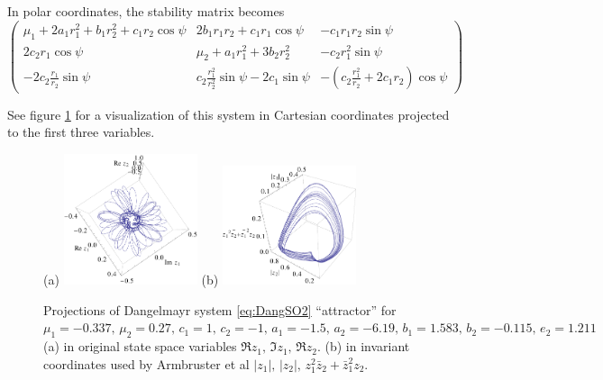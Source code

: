 \documentclass{article}
\begin{document}
In polar coordinates, the stability matrix becomes
\begin{equation}
\left(\begin{array}{ccc}
\mu_1+2a_1r_1^2+b_1r_2^2+c_1r_2\cos\psi & 2b_1r_1r_2+c_1r_1\cos\psi & -c_1r_1r_2\sin\psi\\
2c_2r_1\cos\psi & \mu_2+a_1r_1^2+3b_2r_2^2 & -c_2r_1^2\sin\psi\\
-2c_2\frac{r_1}{r_2}\sin\psi & c_2\frac{r_1^2}{r_2^2}\sin\psi-2c_1\sin\psi & -(c_2\frac{r_1^2}{r_2}+2c_1r_2)\cos\psi
\end{array}\right)
\end{equation}



See figure \ref{fig:dangelmayrChaos} for a visualization of this system
in Cartesian coordinates projected to the first three variables.
\begin{figure}
\centering
 (a) \includegraphics[width=0.35\textwidth]{dangelmayrZ}
 (b) \includegraphics[width=0.35\textwidth]{dangelmayrAGH}
\caption{Projections of Dangelmayr system \ref{eq:DangSO2}
``attractor'' for $\mu_1 = -0.337,\, \mu_2 = 0.27,\, c_1 = 1,\, c_2 =
-1,\, a_1 = -1.5,\, a_2 = -6.19,\, b_1 = 1.583,\,  b_2 = -0.115,\, e_2 =
1.211$
(a) in original state space variables $\Re z_1,\,\Im z_1,\,\Re z_2$.
(b) in invariant coordinates used by
Armbruster et al \cite{AGHO288} $|z_1|,\, |z_2|,\, z_1^2 \bar{z}_2 + \bar{z}_1^2 z_2$.
}
 \label{fig:dangelmayrChaos}
\end{figure}
\end{document}

